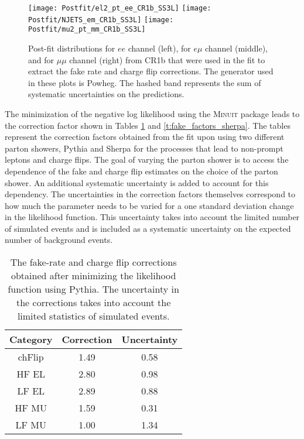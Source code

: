 \begin{figure}[htb]
  \texttt{[image: Postfit/el2\_pt\_ee\_CR1b\_SS3L]}
  \texttt{[image: Postfit/NJETS\_em\_CR1b\_SS3L]}
  \texttt{[image: Postfit/mu2\_pt\_mm\_CR1b\_SS3L]}
\caption{
Post-fit distributions for  $ee$ channel (left), for  $e\mu$ channel (middle), and  for  $\mu\mu$ channel (right) from CR1b that were used in the fit to extract the fake rate and charge flip corrections.
The generator used in these plots is Powheg. The hashed band represents the sum of systematic uncertainties on the predictions.
\label{f:postfit_CR1b}
}
\end{figure}

The minimization of the negative log likelihood using the \textsc{Minuit} package leads 
to the correction factor shown in Tables \ref{t:fake_factors_powheg} and \ref{t:fake_factors_sherpa}.
The tables represent the correction factors obtained from the fit upon using two different parton showers, Pythia and Sherpa
for the processes that lead to non-prompt leptons and charge flips.
The goal of varying the parton shower is to access the dependence of the fake and charge flip estimates on the choice of the 
parton shower. An additional systematic uncertainty is added to account for this dependency. 
The uncertainties in the correction factors themselves correspond to how much the parameter needs to be varied for 
a one standard deviation change in the likelihood function. This uncertainty takes into account the limited number of simulated events and is included as a 
systematic uncertainty on the expected number of background events. 


\begin{table}[htb]
  \caption{The fake-rate and charge flip corrections obtained after minimizing the likelihood function using Pythia.
    The uncertainty in the corrections takes into account the limited statistics of simulated events.
    \label{t:fake_factors_powheg}}
  \centering
   \begin{tabular}{|c|c|c|}
          \hline
          Category & Correction & Uncertainty  \\
          \hline
          chFlip & 1.49 & 0.58 \\ 
          HF EL & 2.80 & 0.98 \\
          LF EL & 2.89 & 0.88 \\
          HF MU & 1.59 & 0.31 \\
          LF MU & 1.00 & 1.34 \\
          \hline
        \end{tabular}
\end{table}

